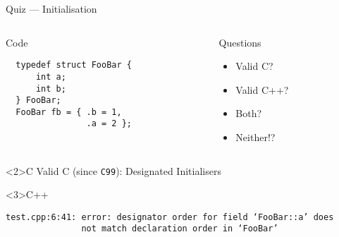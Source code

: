 \documentclass[presentation,aspectratio=169]{beamer}
\begin{document}
\begin{frame}[fragile,label={sec:org23c4234}]{Quiz — Initialisation}
\begin{columns}
\begin{column}{0.48\columnwidth}
\begin{block}{Code}
\begin{verbatim}
  typedef struct FooBar {
      int a;
      int b;
  } FooBar;
  FooBar fb = { .b = 1,
                .a = 2 };
\end{verbatim}
\end{block}
\end{column}

\begin{column}{0.48\columnwidth}
\begin{block}{Questions}
\begin{itemize}
\item Valid C?
\item Valid C++?
\item Both?
\item Neither!?
\end{itemize}
\end{block}
\end{column}
\end{columns}

\begin{block}<2>{C}
Valid C (since \texttt{C99}): Designated Initialisers
\end{block}

\vspace{-1cm}
\begin{block}<3>{C++}
\begin{verbatim}
test.cpp:6:41: error: designator order for field ‘FooBar::a’ does
               not match declaration order in ‘FooBar’
\end{verbatim}
\end{block}
\end{frame}

\end{document}
